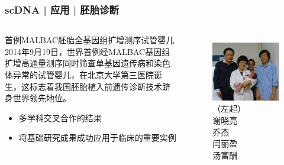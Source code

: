 \documentclass[11pt]{ctexbeamer}
\begin{document}
\begin{frame}
  \frametitle{scDNA | 应用 | 胚胎诊断}
  \begin{columns}
    \begin{block}{首例MALBAC胚胎全基因组扩增测序试管婴儿}
2014年9月19日，世界首例经MALBAC基因组扩增高通量测序同时筛查单基因遗传病和染色体异常的试管婴儿，在北京大学第三医院诞生，这标志着我国\alert{胚胎植入前遗传诊断技术}跻身世界领先地位。
      \begin{itemize}
        \item 多学科交叉合作的结果
        \item 将基础研究成果成功应用于临床的重要实例
      \end{itemize}
    \end{block}
  \begin{figure}
    \centering
    \includegraphics[width=\textwidth]{scDNA_baby.png}\\
    （左起）\\谢晓亮\\乔杰\\闫丽盈\\汤富酬
  \end{figure}
  \end{columns}
\end{frame}
\end{document}
